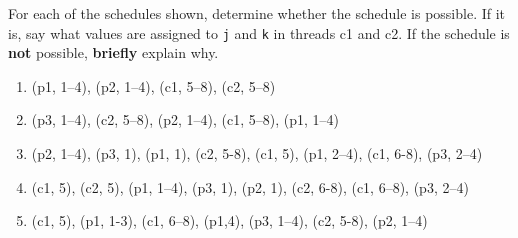 \documentclass[11pt]{article}
\begin{document}
\begin{enumerate}
\begin{multicols}{2}
            For each of the schedules shown, determine whether the schedule
            is possible.  If it is, say what values are assigned to
            \texttt{j} and \texttt{k} in threads c1 and c2.  If the schedule
            is \textbf{not} possible, \textbf{briefly} explain why.

            \vspace{-1mm}

            \begin{enumerate}

              \addtolength{\itemsep}{32mm}

              \item (p1, 1--4), (p2, 1--4), (c1, 5--8), (c2, 5--8)

                    \bigskip


              \item (p3, 1--4), (c2, 5--8), (p2, 1--4), (c1, 5--8), (p1,
                    1--4)

                    \bigskip


                    \columnbreak

              \item (p2, 1--4), (p3, 1), (p1, 1), (c2, 5-8), (c1, 5), (p1,
                    2--4), (c1, 6-8), (p3, 2--4)

                    \bigskip


              \item (c1, 5), (c2, 5), (p1, 1--4), (p3, 1), (p2, 1), (c2,
                    6-8), (c1, 6--8), (p3, 2--4)

                    \bigskip


              \item (c1, 5), (p1, 1-3), (c1, 6--8), (p1,4), (p3, 1--4), (c2,
                    5-8), (p2, 1--4)

                    \bigskip


            \end{enumerate}

            \vspace{-2.5mm}


\end{multicols}
\end{enumerate}
\end{document}
